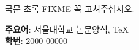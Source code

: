\documentclass[doctor]{snuee}
\begin{document}
	
	
	
	
	
	
	


%
\begin{summary}
	\par    %
	국문 초록 FIXME 꼭 고쳐주십시오. 
	
	\lipsum[1-3]
	\vfill
	\begin{minipage}[t][20mm][b]{\textwidth}
		{\bfseries 주요어}: 서울대학교 논문양식, TeX\\
		{\bfseries 학번}: 2000-00000\\
	\end{minipage}
\end{summary}
\changepage {-15mm}{}{}{}{}{}{}{}{15mm} %
\end{document}
